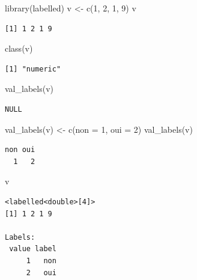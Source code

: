 \documentclass[
  letterpaper,
  DIV=11,
  numbers=noendperiod,
  oneside]{scrreprt}
\newenvironment{Shaded}{\begin{snugshade}}{\end{snugshade}}
\newcommand{\AttributeTok}[1]{\textcolor[rgb]{0.40,0.45,0.13}{#1}}
\newcommand{\DecValTok}[1]{\textcolor[rgb]{0.68,0.00,0.00}{#1}}
\newcommand{\FunctionTok}[1]{\textcolor[rgb]{0.28,0.35,0.67}{#1}}
\newcommand{\NormalTok}[1]{\textcolor[rgb]{0.00,0.23,0.31}{#1}}
\newcommand{\OtherTok}[1]{\textcolor[rgb]{0.00,0.23,0.31}{#1}}
\begin{document}
\begin{Shaded}
\begin{Highlighting}[]
\FunctionTok{library}\NormalTok{(labelled)}
\NormalTok{v }\OtherTok{\textless{}{-}} \FunctionTok{c}\NormalTok{(}\DecValTok{1}\NormalTok{, }\DecValTok{2}\NormalTok{, }\DecValTok{1}\NormalTok{, }\DecValTok{9}\NormalTok{)}
\NormalTok{v}
\end{Highlighting}
\end{Shaded}

\begin{verbatim}
[1] 1 2 1 9
\end{verbatim}

\begin{Shaded}
\begin{Highlighting}[]
\FunctionTok{class}\NormalTok{(v)}
\end{Highlighting}
\end{Shaded}

\begin{verbatim}
[1] "numeric"
\end{verbatim}

\begin{Shaded}
\begin{Highlighting}[]
\FunctionTok{val\_labels}\NormalTok{(v)}
\end{Highlighting}
\end{Shaded}

\begin{verbatim}
NULL
\end{verbatim}

\begin{Shaded}
\begin{Highlighting}[]
\FunctionTok{val\_labels}\NormalTok{(v) }\OtherTok{\textless{}{-}} \FunctionTok{c}\NormalTok{(}\AttributeTok{non =} \DecValTok{1}\NormalTok{, }\AttributeTok{oui =} \DecValTok{2}\NormalTok{)}
\FunctionTok{val\_labels}\NormalTok{(v)}
\end{Highlighting}
\end{Shaded}

\begin{verbatim}
non oui 
  1   2 
\end{verbatim}

\begin{Shaded}
\begin{Highlighting}[]
\NormalTok{v}
\end{Highlighting}
\end{Shaded}

\begin{verbatim}
<labelled<double>[4]>
[1] 1 2 1 9

Labels:
 value label
     1   non
     2   oui
\end{verbatim}
\end{document}
